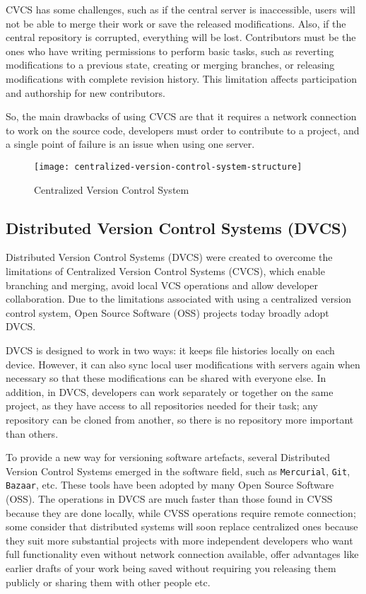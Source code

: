 CVCS has some challenges, such as if the central server is inaccessible, users will not be able to merge their work or save the released modifications. Also, if the central repository is corrupted, everything will be lost. Contributors must be the ones who have writing permissions to perform basic tasks, such as reverting modifications to a previous state, creating or merging branches, or releasing modifications with complete revision history. This limitation affects participation and authorship for new contributors.

So, the main drawbacks of using CVCS are that it requires a network connection to work on the source code, developers must order to contribute to a project, and a single point of failure is an issue when using one server.

\begin{figure}[h]
    \centering
    \texttt{[image: centralized-version-control-system-structure]}
    \caption{Centralized Version Control System}
    \label{fig:cvcs-structure}
\end{figure}
\subsection{Distributed Version Control Systems (DVCS)}
Distributed Version Control Systems (DVCS) were created to overcome the limitations of Centralized Version Control Systems (CVCS), which enable branching and merging, avoid local VCS operations and allow developer collaboration. Due to the limitations associated with using a centralized version control system, Open Source Software (OSS) projects today broadly adopt DVCS.

DVCS is designed to work in two ways: it keeps file histories locally on each device. However, it can also sync local user modifications with servers again when necessary so that these modifications can be shared with everyone else. In addition, in DVCS, developers can work separately or together on the same project, as they have access to all repositories needed for their task; any repository can be cloned from another, so there is no repository more important than others.

To provide a new way for versioning software artefacts, several Distributed Version Control Systems emerged in the software field, such as \lstinline{Mercurial}, \lstinline{Git}, \lstinline{Bazaar}, etc. These tools have been adopted by many Open Source Software (OSS). The operations in DVCS are much faster than those found in CVSS because they are done locally, while CVSS operations require remote connection; some consider that distributed systems will soon replace centralized ones because they suit more substantial projects with more independent developers who want full functionality even without network connection available, offer advantages like earlier drafts of your work being saved without requiring you releasing them publicly or sharing them with other people etc.

